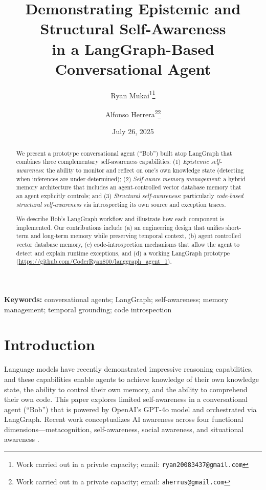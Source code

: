\documentclass[11pt]{article}
\title{Demonstrating Epistemic and Structural Self-Awareness \\in a LangGraph-Based Conversational Agent}
\author{
  Ryan Mukai\textsuperscript{1}\thanks{Work carried out in a private capacity; email: \texttt{ryan20083437@gmail.com}} 
  \and
  Alfonso Herrera\textsuperscript{2}\thanks{Work carried out in a private capacity; email: \texttt{aherrus@gmail.com}}
}
\date{July 26, 2025}
\begin{document}
\maketitle

\begin{abstract}
We present a prototype conversational agent (“Bob”) built atop LangGraph that combines three complementary self-awareness capabilities:
(1) \emph{Epistemic self-awareness}: the ability to monitor and reflect on one’s own knowledge state (detecting when inferences are under-determined);
(2) \emph{Self-aware memory management}: a hybrid memory architecture that includes an agent-controlled vector database memory that an agent explicitly controls; and
(3) \emph{Structural self-awareness}: particularly \emph{code-based structural self-awareness} via introspecting its own source and exception traces.

We describe Bob’s LangGraph workflow and illustrate how each component is implemented. Our contributions include (a) an engineering design that unifies short-term and long-term memory while preserving temporal context, (b) agent controlled vector database memory, (c) code-introspection mechanisms that allow the agent to detect and explain runtime exceptions, and (d) a working LangGraph prototype (\url{https://github.com/CoderRyan800/langgraph_agent_1}).
\end{abstract}

\textbf{Keywords:} conversational agents; LangGraph; self-awareness; memory management; temporal grounding; code introspection

\vspace{1em}


\section{Introduction}
Language models have recently demonstrated impressive reasoning capabilities, and these capabilities enable agents to achieve knowledge of their own knowledge state, the ability to control their own memory, and the ability to comprehend their own code. This paper explores limited self-awareness in a conversational agent (“Bob”) that is powered by OpenAI’s GPT-4o model and orchestrated via LangGraph.  Recent work conceptualizes AI awareness across four functional dimensions—metacognition, self-awareness, social awareness, and situational awareness \cite{li2025ai}. 
\end{document}
